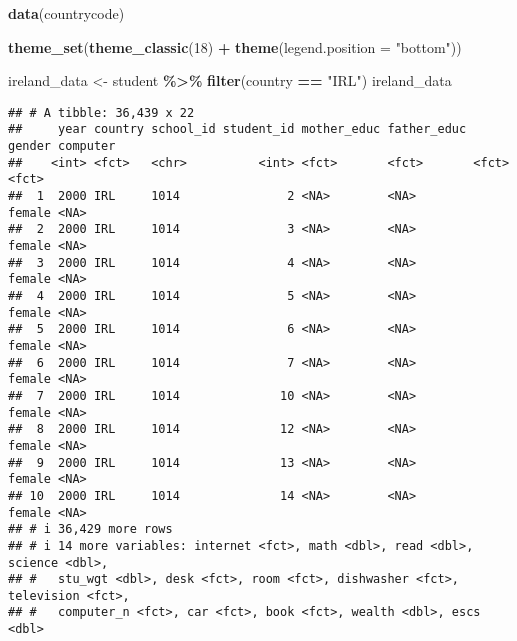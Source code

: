 \documentclass[
]{article}
\newenvironment{Shaded}{\begin{snugshade}}{\end{snugshade}}
\newcommand{\AttributeTok}[1]{\textcolor[rgb]{0.13,0.29,0.53}{#1}}
\newcommand{\DecValTok}[1]{\textcolor[rgb]{0.00,0.00,0.81}{#1}}
\newcommand{\FunctionTok}[1]{\textcolor[rgb]{0.13,0.29,0.53}{\textbf{#1}}}
\newcommand{\NormalTok}[1]{#1}
\newcommand{\OtherTok}[1]{\textcolor[rgb]{0.56,0.35,0.01}{#1}}
\newcommand{\SpecialCharTok}[1]{\textcolor[rgb]{0.81,0.36,0.00}{\textbf{#1}}}
\newcommand{\StringTok}[1]{\textcolor[rgb]{0.31,0.60,0.02}{#1}}
\begin{document}
\begin{Shaded}
\begin{Highlighting}[]
\FunctionTok{data}\NormalTok{(countrycode)}

\FunctionTok{theme\_set}\NormalTok{(}\FunctionTok{theme\_classic}\NormalTok{(}\DecValTok{18}\NormalTok{) }\SpecialCharTok{+}
            \FunctionTok{theme}\NormalTok{(}\AttributeTok{legend.position =} \StringTok{"bottom"}\NormalTok{))}
\end{Highlighting}
\end{Shaded}

\begin{Shaded}
\begin{Highlighting}[]
\NormalTok{ireland\_data }\OtherTok{\textless{}{-}}\NormalTok{ student }\SpecialCharTok{\%\textgreater{}\%} \FunctionTok{filter}\NormalTok{(country }\SpecialCharTok{==} \StringTok{"IRL"}\NormalTok{)}
\NormalTok{ireland\_data}
\end{Highlighting}
\end{Shaded}

\begin{verbatim}
## # A tibble: 36,439 x 22
##     year country school_id student_id mother_educ father_educ gender computer
##    <int> <fct>   <chr>          <int> <fct>       <fct>       <fct>  <fct>   
##  1  2000 IRL     1014               2 <NA>        <NA>        female <NA>    
##  2  2000 IRL     1014               3 <NA>        <NA>        female <NA>    
##  3  2000 IRL     1014               4 <NA>        <NA>        female <NA>    
##  4  2000 IRL     1014               5 <NA>        <NA>        female <NA>    
##  5  2000 IRL     1014               6 <NA>        <NA>        female <NA>    
##  6  2000 IRL     1014               7 <NA>        <NA>        female <NA>    
##  7  2000 IRL     1014              10 <NA>        <NA>        female <NA>    
##  8  2000 IRL     1014              12 <NA>        <NA>        female <NA>    
##  9  2000 IRL     1014              13 <NA>        <NA>        female <NA>    
## 10  2000 IRL     1014              14 <NA>        <NA>        female <NA>    
## # i 36,429 more rows
## # i 14 more variables: internet <fct>, math <dbl>, read <dbl>, science <dbl>,
## #   stu_wgt <dbl>, desk <fct>, room <fct>, dishwasher <fct>, television <fct>,
## #   computer_n <fct>, car <fct>, book <fct>, wealth <dbl>, escs <dbl>
\end{verbatim}

\begin{Shaded}
\end{Shaded}
\end{document}
